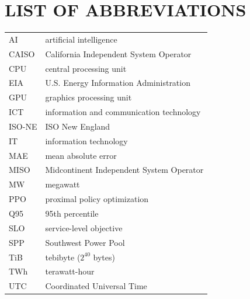 \documentclass{UNCC-thesis}
\begin{document}
\chapter*{LIST OF ABBREVIATIONS}
\begin{singlespace}
\noindent
\begin{tabular}{@{}L{0.18\textwidth}L{0.78\textwidth}@{}}
  AI     & artificial intelligence \\[4pt]
  CAISO  & California Independent System Operator \\[4pt]
  CPU    & central processing unit \\[4pt]
  EIA    & U.S. Energy Information Administration \\[4pt]
  GPU    & graphics processing unit \\[4pt]
  ICT    & information and communication technology \\[4pt]
  ISO-NE & ISO New England \\[4pt]
  IT     & information technology \\[4pt]
  MAE    & mean absolute error \\[4pt]
  MISO   & Midcontinent Independent System Operator \\[4pt]
  MW     & megawatt \\[4pt]
  PPO    & proximal policy optimization \\[4pt]
  Q95    & 95th percentile \\[4pt]
  SLO    & service-level objective \\[4pt]
  SPP    & Southwest Power Pool \\[4pt]
  TiB    & tebibyte (\(2^{40}\) bytes) \\[4pt]
  TWh    & terawatt-hour \\[4pt]
  UTC    & Coordinated Universal Time \\
\end{tabular}
\end{singlespace}

\end{document}
